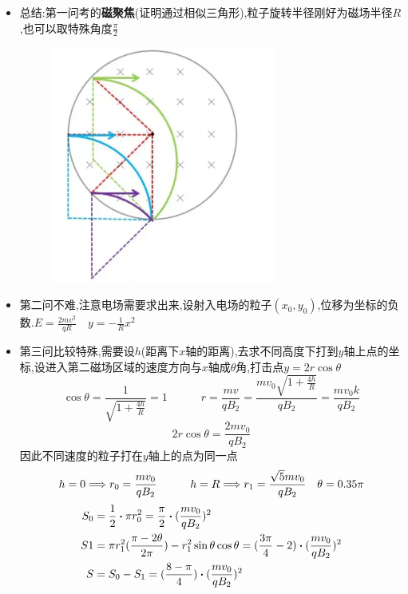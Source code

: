 \documentclass{article}
\begin{document}
    \begin{itemize}
        \item 总结:\quad 第一问考的\textbf{磁聚焦}(证明通过相似三角形),粒子旋转半径刚好为磁场半径$R$,也可以取特殊角度$\frac{\pi}{2}$
        \begin{figure}[h]
            \centering
            \includegraphics[width=20em,keepaspectratio]{./pictures/1.3-7.png}
        \end{figure}
        \item 第二问不难,注意电场需要求出来,设射入电场的粒子$(x_{0},y_{0})$,位移为坐标的负数.$E = \frac{2mv^{2}}{qR} \quad y = - \frac{1}{R} x^{2}$
        \item 第三问比较特殊,需要设$h$(距离下$x$轴的距离),去求不同高度下打到$y$轴上点的坐标,设进入第二磁场区域的速度方向与$x$轴成$\theta$角,打击点$ y = 2 r \cos{\theta}$
        $$
        \cos{\theta} = \frac{1}{\sqrt{1 + \frac{4h}{R}}} = 1 \quad \quad \quad r = \frac{mv}{qB_{2}} = \frac{mv_{0} \sqrt{1+\frac{4h}{R}}}{q B_{2}} = \frac{mv_{0} k}{qB_{2}}
        $$
        $$
        2 r \cos{\theta} = \frac{2mv_{0}}{qB_{2}}
        $$
        因此不同速度的粒子打在$y$轴上的点为同一点
        $$
        h = 0 \Longrightarrow r_{0} = \frac{mv_{0}}{qB_{2}} \quad \quad \quad h = R \Longrightarrow r_{1} = \frac{\sqrt{5} m v_{0}}{qB_{2}} \quad \theta = 0.35\pi
        $$
        \begin{align*}
            S_{0} &= \frac{1}{2} \vdot \pi r_{0}^{2} = \frac{\pi}{2} \vdot (\frac{mv_{0}}{qB_{2}})^{2} \\
            S{1} &= \pi r_{1}^{2} (\frac{\pi - 2\theta}{2 \pi}) - r_{1}^{2} \sin{\theta} \cos{\theta} = (\frac{3\pi}{4} - 2) \vdot (\frac{m v_{0}}{qB_{2}})^{2} \\
            S &= S_{0} - S_{1} = (\frac{8-\pi}{4}) \vdot (\frac{m v_{0}}{qB_{2}})^{2}
        \end{align*}
    \end{itemize}
        
\end{document}
